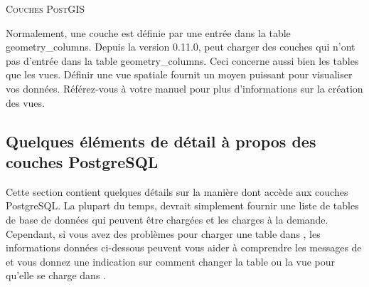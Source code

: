 \begin{Tip}\caption{\textsc{Couches PostGIS}}
Normalement, une couche \pg est définie par une entrée dans la table geometry\_columns. Depuis la version 0.11.0, \qg peut charger des couches qui n'ont pas d'entrée dans la table geometry\_columns. Ceci concerne aussi bien les tables que les vues. Définir une vue spatiale fournit un moyen puissant pour visualiser vos données. Référez-vous à votre manuel \psq pour plus d'informations sur la création des vues.
\end{Tip}

\subsection{Quelques éléments de détail à propos des couches PostgreSQL} \label{sec:postgis_details}

Cette section contient quelques détails sur la manière dont \qg accède aux couches PostgreSQL. La plupart du temps, \qg devrait simplement fournir une liste de tables de base de données qui peuvent être chargées et les charges à la demande. Cependant, si vous avez des problèmes pour charger une table \psq dans \qg, les informations données ci-dessous peuvent vous aider à comprendre les messages de \qg et vous donnez une indication sur comment changer la table ou la vue \psq pour qu'elle se charge dans \qg.

